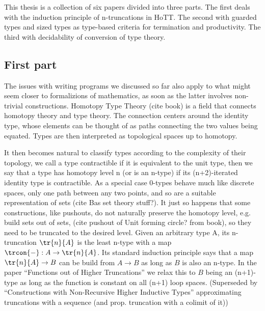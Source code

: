 This thesis is a collection of six papers divided into three parts.
The first deals with the induction principle of n-truncations in HoTT.
The second with guarded types and sized types as type-based criteria
for termination and productivity. The third with decidability of
conversion of type theory.

\subsection{First part}
The issues with writing programs we discussed so far also apply to
what might seem closer to formalizions of mathematics, as soon as the
latter involves non-trivial constructions.
Homotopy Type Theory (cite book) is a field that connects homotopy theory and type theory.
The connection centers around the identity type, whose elements can be
thought of as paths connecting the two values being equated. Types are
then interpreted as topological spaces up to homotopy.

It then becomes natural to classify types according to the complexity
of their topology, we call a type contractible if it is equivalent to
the unit type, then we say that a type has homotopy level n (or is an
n-type) if its (n+2)-iterated identity type is contractible. As a
special case 0-types behave much like discrete spaces, only one path
between any two points, and so are a suitable representation of sets (cite Bas set theory stuff?).
It just so happens that some constructions, like pushouts, do not
naturally preserve the homotopy level, e.g. build sets out of sets, (cite
pushout of Unit forming circle? from book), so they need to be
truncated to the desired level.
Given an arbitrary type A, its n-truncation $\tr{n}{A}$ is the least
n-type with a map $\trcon{-} : A \to \tr{n}{A}$.  Its standard
induction principle says that a map $\tr{n}{A} \to B$ can be build
from $A \to B$ as long as $B$ is also an n-type.
In the paper ``Functions out of Higher Truncations'' we relax this to
$B$ being an (n+1)-type as long as the function is constant on all (n+1) loop spaces.
(Superseded by ``Constructions with Non-Recursive Higher Inductive
Types'' approximating truncations with a sequence (and
prop. truncation with a colimit of it))



